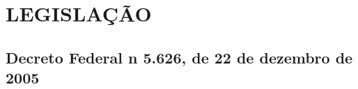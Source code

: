\clearpage\section{LEGISLAÇÃO}
\label{anexoLegislacao}

\subsection{Decreto Federal n 5.626, de 22 de dezembro de 2005}
\label{anexoDecreto}


